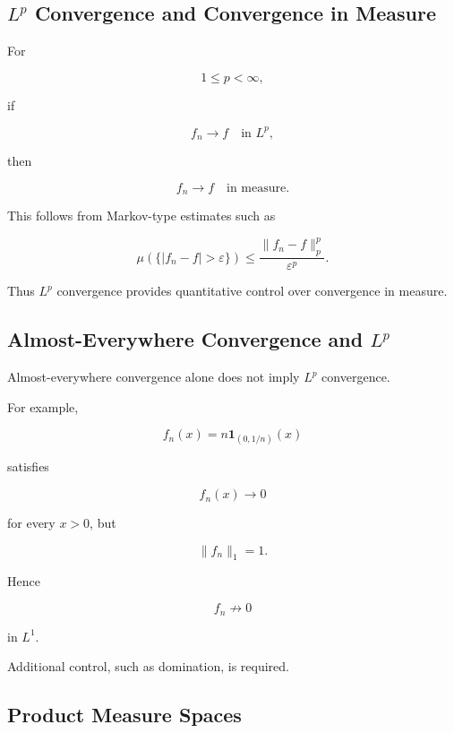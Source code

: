 \subsection{\(L^p\) Convergence and Convergence in Measure}
\label{subsec:lp-to-measure}

For

\[
1\leq p<\infty,
\]

if

\[
f_n\to f
\quad\text{in }L^p,
\]

then

\[
\boxed{
f_n\to f
\quad\text{in measure}.
}
\]

This follows from Markov-type estimates such as

\[
\boxed{
\mu(
\{|f_n-f|>\varepsilon\}
)
\leq
\frac{\|f_n-f\|_p^p}{\varepsilon^p}.
}
\]

Thus \(L^p\) convergence provides quantitative control over convergence in
measure.

\subsection{Almost-Everywhere Convergence and \(L^p\)}
\label{subsec:ae-versus-lp}

Almost-everywhere convergence alone does not imply \(L^p\) convergence.

For example,

\[
f_n(x)
=
n\mathbf{1}_{(0,1/n)}(x)
\]

satisfies

\[
f_n(x)\to0
\]

for every \(x>0\), but

\[
\|f_n\|_1=1.
\]

Hence

\[
f_n\not\to0
\]

in \(L^1\).

Additional control, such as domination, is required.

\subsection{Product Measure Spaces}
\label{subsec:product-measure-spaces}

